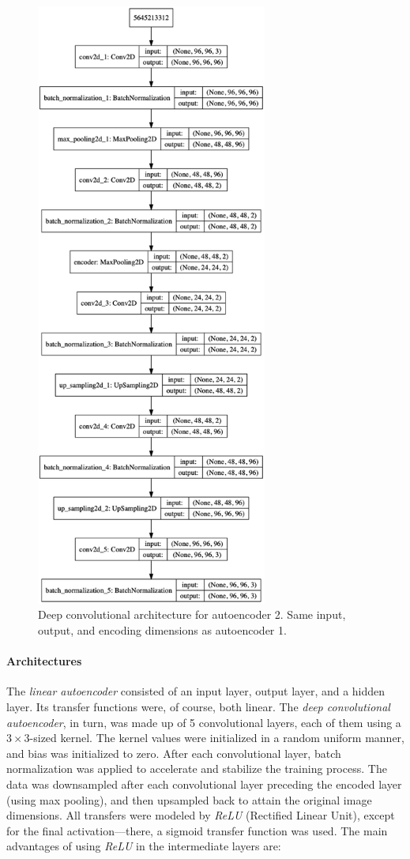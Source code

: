 \begin{figure}[!htbp]
	\begin{center}
		\includegraphics[height=20cm, keepaspectratio]{images/auto_conv_architecture}
		\caption{Deep convolutional architecture for autoencoder 2. Same input, output, and encoding dimensions as autoencoder 1.}
		\label{fig:auto2}
	\end{center}
\end{figure}

\paragraph{Architectures} The \textit{linear autoencoder} consisted of an input layer, output layer, and a hidden layer. Its transfer functions were, of course, both linear. The \textit{deep convolutional autoencoder}, in turn, was made up of 5 convolutional layers, each of them using a $3 \times 3$-sized kernel. The kernel values were initialized in a random uniform manner, and bias was initialized to zero. After each convolutional layer, batch normalization was applied to accelerate and stabilize the training process. The data was downsampled after each convolutional layer preceding the encoded layer (using max pooling), and then upsampled back to attain the original image dimensions. All transfers were modeled by \textit{ReLU} (Rectified Linear Unit), except for the final activation---there, a sigmoid transfer function was used. The main advantages of using \textit{ReLU} in the intermediate layers are:

